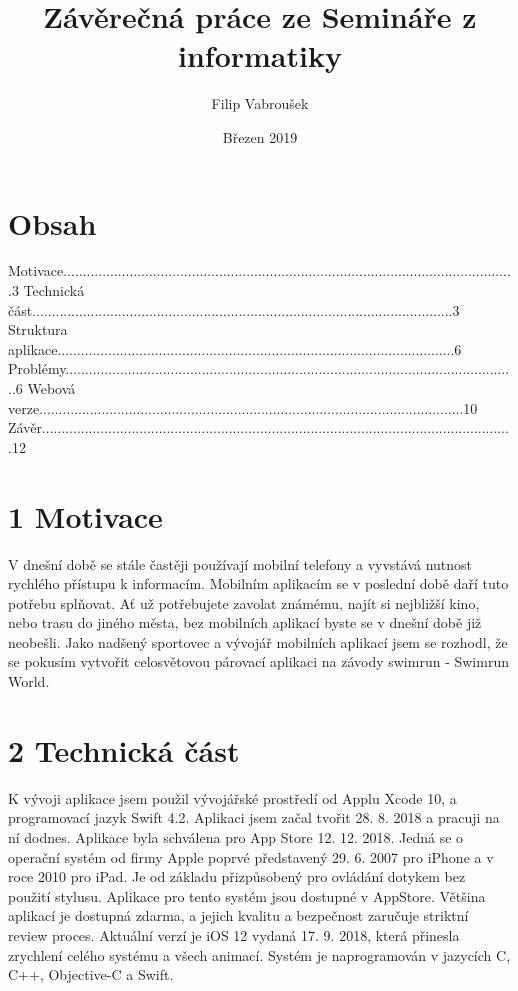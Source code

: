 \documentclass{article}
\title{Závěrečná práce ze Semináře z informatiky}
\author{Filip Vabroušek }
\date{Březen 2019}
\begin{document}
\maketitle
\vspace{130 mm}
\section*{Obsah}

Motivace....................................................................................................................3 \hfill \break
Technická část............................................................................................................3 \hfill \break
Struktura aplikace......................................................................................................6  \hfill \break
Problémy....................................................................................................................6  \hfill \break
Webová verze.............................................................................................................10  \hfill \break
Závěr.........................................................................................................................12  \hfill \break


\vspace{180 mm}
\section*{ 1 Motivace}

	V dnešní době se stále častěji používají mobilní telefony a vyvstává nutnost rychlého  přístupu k informacím. Mobilním aplikacím se v poslední době daří tuto potřebu splňovat. Ať už potřebujete zavolat známému, najít si nejbližší kino, nebo trasu do jiného města, bez mobilních aplikací byste se v dnešní době již neobešli. Jako nadšený sportovec a vývojář mobilních aplikací jsem se rozhodl, že se pokusím vytvořit celosvětovou párovací aplikaci na závody swimrun - Swimrun World.




\vspace{10 mm}
\section*{2 Technická část}

K vývoji aplikace jsem použil vývojářské prostředí od Applu Xcode 10, a programovací jazyk Swift 4.2. Aplikaci jsem začal tvořit 28. 8. 2018 a pracuji na ní dodnes. Aplikace byla schválena pro App Store 12. 12. 2018.
 \hfill \break
 \hfill \break
Jedná se o operační systém od firmy Apple poprvé představený 29. 6. 2007 pro iPhone a v roce 2010 pro iPad.  Je od základu přizpůsobený pro ovládání dotykem bez použití stylusu. Aplikace pro tento systém jsou dostupné v AppStore. Většina aplikací je dostupná zdarma, a jejich kvalitu a bezpečnost zaručuje striktní review proces. Aktuální verzí je iOS 12 vydaná 17. 9. 2018, která přinesla zrychlení celého systému a všech animací. Systém je naprogramován v jazycích C, C++, Objective-C a Swift.
\end{document}
